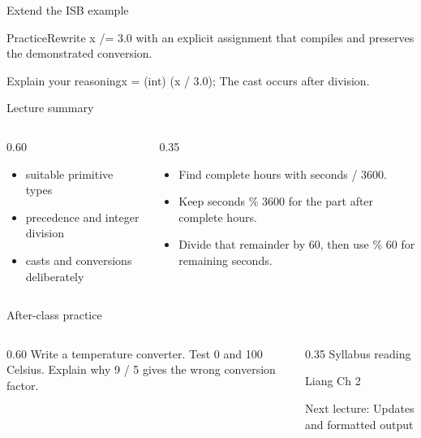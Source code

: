 \documentclass[10pt,aspectratio=169]{beamer}
\begin{document}
\begin{frame}[fragile,t]{Extend the ISB example}
\begin{alertblock}{Practice}Rewrite x /= 3.0 with an explicit assignment that compiles and preserves the demonstrated conversion.\end{alertblock}\vspace{3mm}\begin{exampleblock}{Explain your reasoning}x = (int) (x / 3.0); The cast occurs after division.\end{exampleblock}
\end{frame}
\begin{frame}[fragile,t]{Lecture summary}
\begin{columns}[T,onlytextwidth]\begin{column}{0.60\textwidth}
\begin{itemize}
\item suitable primitive types
\item precedence and integer division
\item casts and conversions deliberately
\end{itemize}
\end{column}\begin{column}{0.35\textwidth}\small
\begin{itemize}
\item Find complete hours with seconds / 3600.
\item Keep seconds \% 3600 for the part after complete hours.
\item Divide that remainder by 60, then use \% 60 for remaining seconds.
\end{itemize}
\end{column}\end{columns}
\end{frame}

\begin{frame}[fragile,t]{After-class practice}
\begin{columns}[T,onlytextwidth]\begin{column}{0.60\textwidth}
Write a temperature converter. Test 0 and 100 Celsius. Explain why 9 / 5 gives the wrong conversion factor.
\end{column}\begin{column}{0.35\textwidth}\small
Syllabus reading\par Liang Ch 2

Next lecture: Updates and formatted output
\end{column}\end{columns}
\end{frame}
\end{document}

